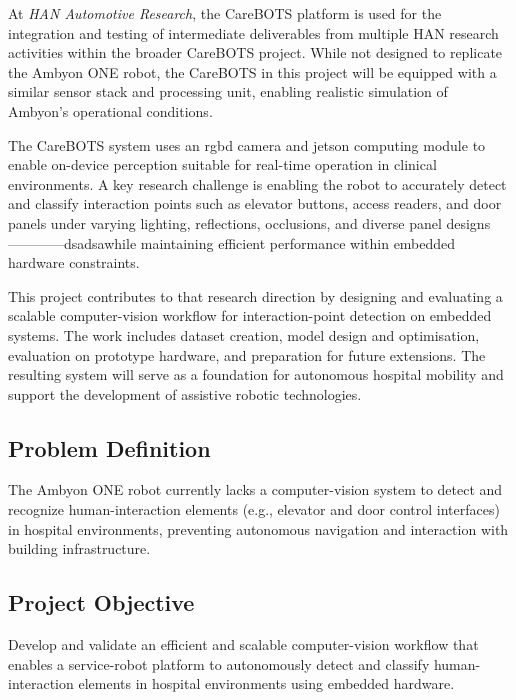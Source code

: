At \textit{HAN Automotive Research}, the CareBOTS platform is used for the integration and testing of intermediate deliverables from multiple HAN research activities within the broader CareBOTS project. While not designed to replicate the Ambyon ONE robot, the CareBOTS in this project will be equipped with a similar sensor stack and processing unit, enabling realistic simulation of Ambyon's operational conditions.

The CareBOTS system uses an \gls{rgbd} camera and \gls{jetson} computing module to enable on-device perception suitable for real-time operation in clinical environments. A key research challenge is enabling the robot to accurately detect and classify interaction points such as elevator buttons, access readers, and door panels under varying lighting, reflections, occlusions, and diverse panel designs------------dsadsawhile maintaining efficient performance within embedded hardware constraints.

This project contributes to that research direction by designing and evaluating a scalable computer-vision workflow for interaction-point detection on embedded systems. The work includes dataset creation, model design and optimisation, evaluation on prototype hardware, and preparation for future extensions. The resulting system will serve as a foundation for autonomous hospital mobility and support the development of assistive robotic technologies.


\subsection{Problem Definition}
The Ambyon ONE robot currently lacks a computer-vision system to detect and recognize human-interaction elements (e.g., elevator and door control interfaces) in hospital environments, preventing autonomous navigation and interaction with building infrastructure.

\subsection{Project Objective}
Develop and validate an efficient and scalable computer-vision workflow that enables a service-robot platform to autonomously detect and classify human-interaction elements in hospital environments using embedded hardware.

